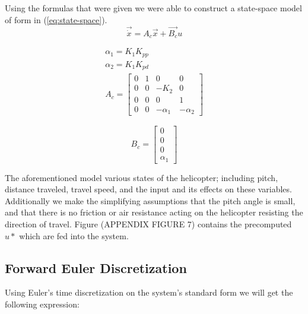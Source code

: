 Using the formulas that were given we were able to construct a state-space model of form in (\ref{eq:state-space}).
\begin{equation}\label{eq:state-space}
	\vec{\dot{x}} = A_c \vec{x} + \vec{B_c} u
\end{equation}

\begin{subequations}
\begin{align}
\alpha_1 = K_1K_{pp} \\
\alpha_2 = K_1K_{pd} \\
A_c =
\begin{bmatrix}
    0 & 1 & 0 & 0 \\
    0 & 0 & -K_2 & 0 \\
    0 & 0 & 0 & 1 \\
    0 & 0 & -\alpha_1 & - \alpha_2
\end{bmatrix}
\label{eq:initial_state}
\end{align}
\end{subequations}

\begin{equation}
B_c =
\begin{bmatrix}
	0 \\
	0 \\
	0 \\
	\alpha_1
\end{bmatrix}
\end{equation}

The aforementioned model various states of the helicopter; including pitch, distance traveled, travel speed, and the input and its effects on these variables. Additionally we make the  simplifying assumptions that the pitch angle is small, and that there is no friction or air resistance acting on the helicopter resisting the direction of travel. Figure (APPENDIX FIGURE 7) contains the precomputed $u*$ which are fed into the system.

\subsection{Forward Euler Discretization}

Using Euler's time discretization on the system's standard form we will get the following expression:

